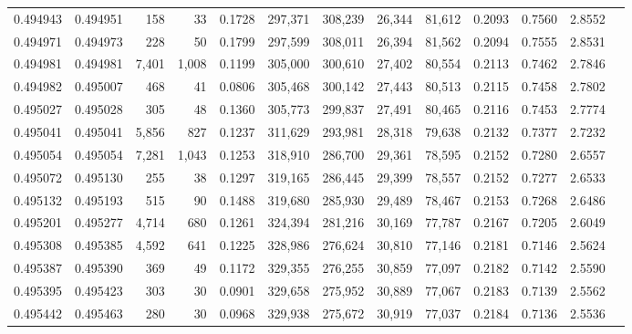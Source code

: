 \begin{tabular}{rrrrrrrrrrrrr}
0.494943 & 0.494951 &   158 &    33 &                                     0.1728 & 297,371 & 308,239 &  26,344 &  81,612 & 0.2093 & 0.7560 & 2.8552 \\
0.494971 & 0.494973 &   228 &    50 &                                     0.1799 & 297,599 & 308,011 &  26,394 &  81,562 & 0.2094 & 0.7555 & 2.8531 \\
0.494981 & 0.494981 & 7,401 & 1,008 &                                     0.1199 & 305,000 & 300,610 &  27,402 &  80,554 & 0.2113 & 0.7462 & 2.7846 \\
0.494982 & 0.495007 &   468 &    41 &                                     0.0806 & 305,468 & 300,142 &  27,443 &  80,513 & 0.2115 & 0.7458 & 2.7802 \\
0.495027 & 0.495028 &   305 &    48 &                                     0.1360 & 305,773 & 299,837 &  27,491 &  80,465 & 0.2116 & 0.7453 & 2.7774 \\
0.495041 & 0.495041 & 5,856 &   827 &                                     0.1237 & 311,629 & 293,981 &  28,318 &  79,638 & 0.2132 & 0.7377 & 2.7232 \\
0.495054 & 0.495054 & 7,281 & 1,043 &                                     0.1253 & 318,910 & 286,700 &  29,361 &  78,595 & 0.2152 & 0.7280 & 2.6557 \\
0.495072 & 0.495130 &   255 &    38 &                                     0.1297 & 319,165 & 286,445 &  29,399 &  78,557 & 0.2152 & 0.7277 & 2.6533 \\
0.495132 & 0.495193 &   515 &    90 &                                     0.1488 & 319,680 & 285,930 &  29,489 &  78,467 & 0.2153 & 0.7268 & 2.6486 \\
0.495201 & 0.495277 & 4,714 &   680 &                                     0.1261 & 324,394 & 281,216 &  30,169 &  77,787 & 0.2167 & 0.7205 & 2.6049 \\
0.495308 & 0.495385 & 4,592 &   641 &                                     0.1225 & 328,986 & 276,624 &  30,810 &  77,146 & 0.2181 & 0.7146 & 2.5624 \\
0.495387 & 0.495390 &   369 &    49 &                                     0.1172 & 329,355 & 276,255 &  30,859 &  77,097 & 0.2182 & 0.7142 & 2.5590 \\
0.495395 & 0.495423 &   303 &    30 &                                     0.0901 & 329,658 & 275,952 &  30,889 &  77,067 & 0.2183 & 0.7139 & 2.5562 \\
0.495442 & 0.495463 &   280 &    30 &                                     0.0968 & 329,938 & 275,672 &  30,919 &  77,037 & 0.2184 & 0.7136 & 2.5536 \\

\end{tabular}
